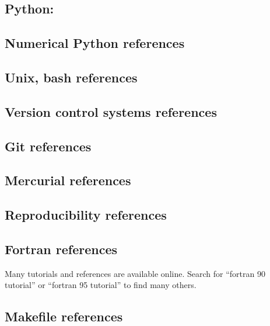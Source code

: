 \documentclass[letterpaper,10pt,english]{sphinxmanual}
\begin{document}
\subsection{Python:}
\label{biblio:biblio-python}\label{biblio:id5}

\subsection{Numerical Python references}
\label{biblio:biblio-numpy}\label{biblio:numerical-python-references}

\subsection{Unix, bash references}
\label{biblio:biblio-unix}\label{biblio:unix-bash-references}

\subsection{Version control systems references}
\label{biblio:biblio-vcs}\label{biblio:version-control-systems-references}

\subsection{Git references}
\label{biblio:git-references}\label{biblio:biblio-git}

\subsection{Mercurial references}
\label{biblio:mercurial-references}

\subsection{Reproducibility references}
\label{biblio:reproducibility-references}\label{biblio:biblio-repro}

\subsection{Fortran references}
\label{biblio:biblio-fortran}\label{biblio:fortran-references}
Many tutorials and references are available online.  Search for
``fortran 90 tutorial'' or ``fortran 95 tutorial'' to find many others.


\subsection{Makefile references}
\label{biblio:makefile-references}\label{biblio:biblio-make}
\end{document}
